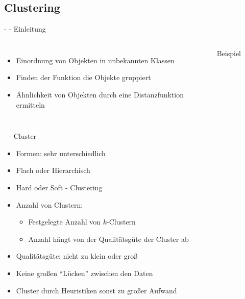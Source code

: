 \documentclass[fleqn,11pt,aspectratio=43]{beamer}
\begin{document}
\subsection{Clustering~}

\begin{frame}{\insertsectionhead - \insertsubsectionhead - Einleitung \cite{ester2000knowledge}}
\begin{columns}[onlytextwidth]
\begin{itemize}
\item Einordnung von Objekten in unbekannten Klassen
\item Finden der Funktion die Objekte gruppiert
\item Ähnlichkeit von Objekten durch eine Distanzfunktion ermitteln
\end{itemize}
\begin{figure}
\scalebox{0.75}{}
\caption{Beispiel}
\end{figure}
\end{columns}
\end{frame}

\begin{frame}{\insertsectionhead - \insertsubsectionhead - Cluster \cite{dwh}}
\begin{itemize}
\item Formen: sehr unterschiedlich
\item Flach oder Hierarchisch
\item Hard oder Soft - Clustering
\item Anzahl von Clustern:
\begin{itemize}
\item Festgelegte Anzahl von $k$-Clustern
\item Anzahl hängt von der Qualitätsgüte der Cluster ab
\end{itemize} 
\item Qualitätsgüte: nicht zu klein oder groß
\item Keine großen \enquote{Lücken} zwischen den Daten
\item Cluster durch Heuristiken sonst zu großer Aufwand
\end{itemize}
\end{frame}
\end{document}
